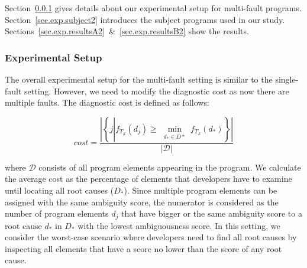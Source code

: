 Section~\ref{sec.exp.setup2} gives details about our experimental setup for multi-fault programs. Section~\ref{sec.exp.subject2} introduces the subject programs used in our study. Sections~\ref{sec.exp.resultsA2}~\&~\ref{sec.exp.resultsB2} show the results.

\subsubsection{Experimental Setup}\label{sec.exp.setup2}

The overall experimental setup for the multi-fault setting is similar to the single-fault setting. However, we need to modify the diagnostic cost as now there are multiple faults. The diagnostic cost is defined as follows:

\begin{equation}\label{equation.avgcost}
	cost = \dfrac{\left|  \left\{ j \left| \right.
           f_{T_{\mathcal{S}}}(d_j) \geq \min_{\substack{d_* \in D*}} f_{T_{\mathcal{S}}}(d_*) \right\} \right|}
           {\left|  \mathcal{D} \right|}
\end{equation}

\noindent where $\mathcal{D}$ consists of all program elements appearing in the program.
We calculate the average cost as the percentage of elements that developers have
to examine until locating all root causes ($D_*$). Since multiple
program elements can be assigned with the same ambiguity score, the numerator
is considered as the number of program elements $d_j$ that have bigger or the
same ambiguity score to a root cause $d_*$ in $D_*$ with the
lowest
ambiguousness
score. In this setting, we consider the worst-case scenario where developers need
to find all root causes by inspecting all elements that have a score no lower than the score of any root cause.



